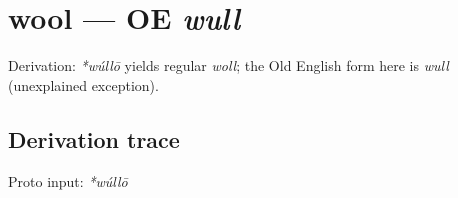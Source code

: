 \documentclass[
  british,
  a4paper,
  openany]{book}
\providecommand{\texorpdfstring}[2]{#1}
\begin{document}
\section{\texorpdfstring{wool --- OE
\emph{wull}}{wool --- OE wull}}\label{wool-oe-wull}


Derivation: \emph{*wúllō} yields regular \emph{woll}; the Old English
form here is \emph{wull} (unexplained exception).

\subsection{Derivation trace}\label{derivation-trace-145}

Proto input: \emph{*wúllō}

\begingroup
\setlength{\fboxsep}{6pt}
\end{document}
